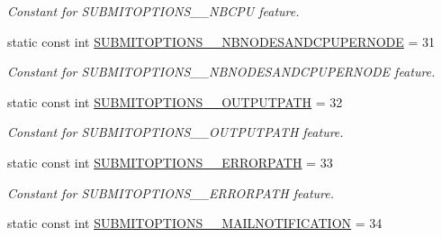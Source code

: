 \begin{DoxyCompactItemize}
\begin{DoxyCompactList}\small\item\em Constant for SUBMITOPTIONS\_\-\_\-NBCPU feature. \item\end{DoxyCompactList}\item 
\hypertarget{classTMS__Data_1_1TMS__DataPackage_a54ea62c193ee4246e57c1d34fd9f13c3}{
static const int \hyperlink{classTMS__Data_1_1TMS__DataPackage_a54ea62c193ee4246e57c1d34fd9f13c3}{SUBMITOPTIONS\_\-\_\-NBNODESANDCPUPERNODE} = 31}
\label{classTMS__Data_1_1TMS__DataPackage_a54ea62c193ee4246e57c1d34fd9f13c3}

\begin{DoxyCompactList}\small\item\em Constant for SUBMITOPTIONS\_\-\_\-NBNODESANDCPUPERNODE feature. \item\end{DoxyCompactList}\item 
\hypertarget{classTMS__Data_1_1TMS__DataPackage_a0fa24515bafef1d2bc170d1858e2f8a2}{
static const int \hyperlink{classTMS__Data_1_1TMS__DataPackage_a0fa24515bafef1d2bc170d1858e2f8a2}{SUBMITOPTIONS\_\-\_\-OUTPUTPATH} = 32}
\label{classTMS__Data_1_1TMS__DataPackage_a0fa24515bafef1d2bc170d1858e2f8a2}

\begin{DoxyCompactList}\small\item\em Constant for SUBMITOPTIONS\_\-\_\-OUTPUTPATH feature. \item\end{DoxyCompactList}\item 
\hypertarget{classTMS__Data_1_1TMS__DataPackage_adc597cc48c322ce1470bfc5738579276}{
static const int \hyperlink{classTMS__Data_1_1TMS__DataPackage_adc597cc48c322ce1470bfc5738579276}{SUBMITOPTIONS\_\-\_\-ERRORPATH} = 33}
\label{classTMS__Data_1_1TMS__DataPackage_adc597cc48c322ce1470bfc5738579276}

\begin{DoxyCompactList}\small\item\em Constant for SUBMITOPTIONS\_\-\_\-ERRORPATH feature. \item\end{DoxyCompactList}\item 
\hypertarget{classTMS__Data_1_1TMS__DataPackage_aea891395e633bd6125f2dd8ac32be13c}{
static const int \hyperlink{classTMS__Data_1_1TMS__DataPackage_aea891395e633bd6125f2dd8ac32be13c}{SUBMITOPTIONS\_\-\_\-MAILNOTIFICATION} = 34}
\label{classTMS__Data_1_1TMS__DataPackage_aea891395e633bd6125f2dd8ac32be13c}


\end{DoxyCompactItemize}
